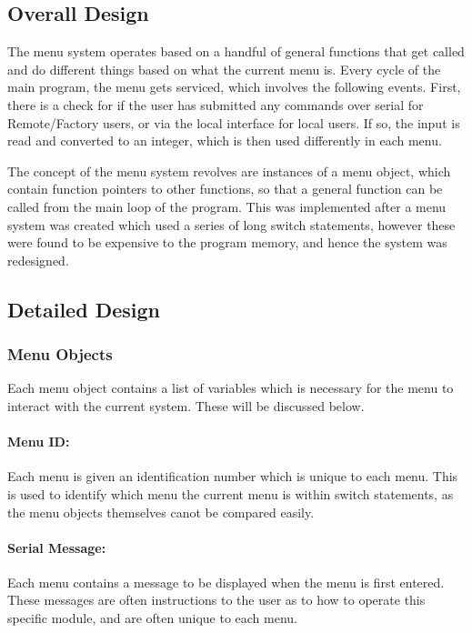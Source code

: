 \documentclass[]{report}
\begin{document}
\subsection{Overall Design}
The menu system operates based on a handful of general functions that get called and do different things based on what the current menu is. Every cycle of the main program, the menu gets serviced, which involves the following events. First, there is a check for if the user has submitted any commands over serial for Remote/Factory users, or via the local interface for local users. If so, the input is read and converted to an integer, which is then used differently in each menu.

The concept of the menu system revolves are instances of a menu object, which contain function pointers to other functions, so that a general function can be called from the main loop of the program. This was implemented after a menu system was created which used a series of long switch statements, however these were found to be expensive to the program memory, and hence the system was redesigned. 

\subsection{Detailed Design}

\subsubsection{Menu Objects}
Each menu object contains a list of variables which is necessary for the menu to interact with the current system. These will be discussed below. 

\paragraph{Menu ID:}
Each menu is given an identification number which is unique to each menu. This is used to identify which menu the current menu is within switch statements, as the menu objects themselves canot be compared easily. 

\paragraph{Serial Message:}
Each menu contains a message to be displayed when the menu is first entered. These messages are often instructions to the user as to how to operate this specific module, and are often unique to each menu.
\end{document}
